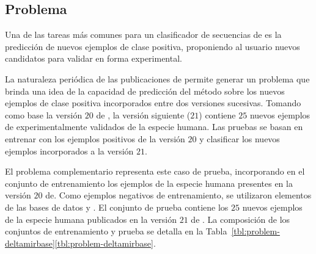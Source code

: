 %
%
\subsection{Problema \deltamirbase{}}
%
Una de las tareas más comunes para un clasificador de secuencias de
 es la predicción de nuevos ejemplos de clase positiva,
proponiendo al usuario nuevos {candidatos} para validar en forma
experimental.

La naturaleza periódica de las publicaciones de \work\mirbase{}
permite generar un problema que brinda una idea de la capacidad de
predicción del método sobre los nuevos ejemplos de clase positiva
incorporados entre dos versiones sucesivas.
Tomando como base la versión $20$ de \work\mirbase{}, la versión siguiente
($21$) contiene $25$ nuevos ejemplos de  experimentalmente
validados de la especie humana.
Las pruebas se basan en entrenar con los ejemplos positivos de la
versión $20$ y clasificar los nuevos ejemplos incorporados a la versión
$21$.

El problema complementario \prob\deltamirbase{} representa este caso
de prueba, incorporando en el conjunto de entrenamiento  los
ejemplos de la especie humana presentes en la versión $20$
de\work\mirbase{}.  Como ejemplos negativos de entrenamiento, se
utilizaron elementos de las bases de datos  \cite{xue} y
 \cite{batuwita}.
El conjunto de prueba contiene los $25$ nuevos ejemplos de la especie humana
publicados en la versión $21$ de \work\mirbase{}.
La composición de los conjuntos de entrenamiento y prueba se detalla en
la \iflatexml{}Tabla~\ref{tbl:problem-deltamirbase}\else\autoref{tbl:problem-deltamirbase}\fi.
